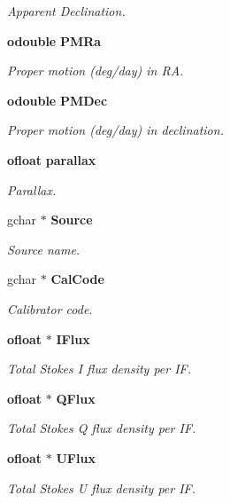 \begin{CompactItemize}
\begin{CompactList}\small\item\em Apparent Declination. \item\end{CompactList}\item 
{\bf odouble} {\bf PMRa}
\begin{CompactList}\small\item\em Proper motion (deg/day) in RA. \item\end{CompactList}\item 
{\bf odouble} {\bf PMDec}
\begin{CompactList}\small\item\em Proper motion (deg/day) in declination. \item\end{CompactList}\item 
{\bf ofloat} {\bf parallax}
\begin{CompactList}\small\item\em Parallax. \item\end{CompactList}\item 
gchar $\ast$ {\bf Source}
\begin{CompactList}\small\item\em Source name. \item\end{CompactList}\item 
gchar $\ast$ {\bf Cal\-Code}
\begin{CompactList}\small\item\em Calibrator code. \item\end{CompactList}\item 
{\bf ofloat} $\ast$ {\bf IFlux}
\begin{CompactList}\small\item\em Total Stokes I flux density per IF. \item\end{CompactList}\item 
{\bf ofloat} $\ast$ {\bf QFlux}
\begin{CompactList}\small\item\em Total Stokes Q flux density per IF. \item\end{CompactList}\item 
{\bf ofloat} $\ast$ {\bf UFlux}
\begin{CompactList}\small\item\em Total Stokes U flux density per IF. \item\end{CompactList}\item 

\end{CompactItemize}
